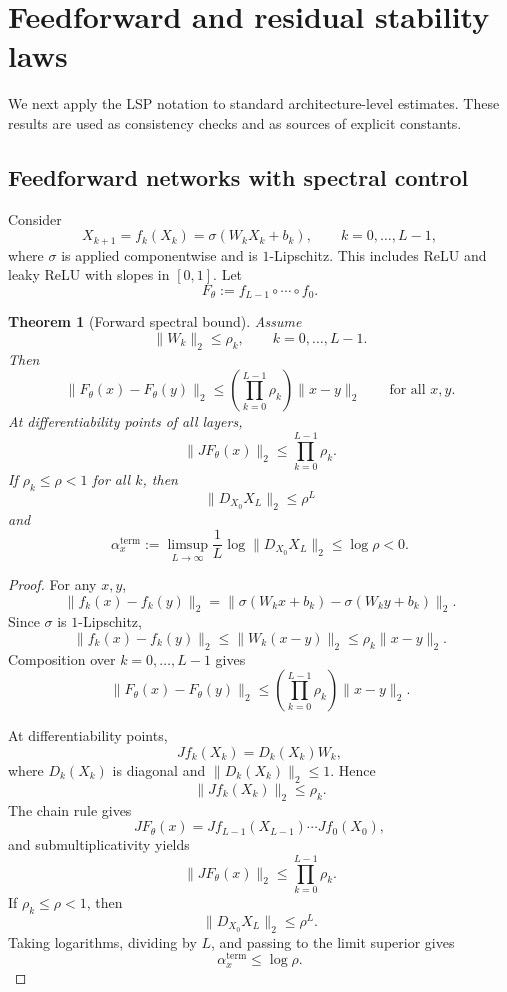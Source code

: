 \documentclass{article}
\newtheorem{theorem}{Theorem}[section]
\numberwithin{equation}{section}
\begin{document}
\section{Feedforward and residual stability laws}
\label{sec:spectral-residual-laws}

We next apply the LSP notation to standard architecture-level estimates. These
results are used as consistency checks and as sources of explicit constants.

\subsection{Feedforward networks with spectral control}
\label{subsec:feedforward-laws}

Consider
\[
X_{k+1}
=
f_k(X_k)
=
\sigma(W_kX_k+b_k),
\qquad
k=0,\ldots,L-1,
\]
where \(\sigma\) is applied componentwise and is \(1\)-Lipschitz. This includes
ReLU and leaky ReLU with slopes in \([0,1]\). Let
\[
F_\theta:=f_{L-1}\circ\cdots\circ f_0 .
\]

\begin{theorem}[Forward spectral bound]
\label{thm:ff-spectral-stability}
Assume
\[
\|W_k\|_2\le \rho_k,
\qquad
k=0,\ldots,L-1 .
\]
Then
\[
\|F_\theta(x)-F_\theta(y)\|_2
\le
\left(\prod_{k=0}^{L-1}\rho_k\right)\|x-y\|_2
\qquad
\text{for all }x,y .
\]
At differentiability points of all layers,
\[
\|JF_\theta(x)\|_2
\le
\prod_{k=0}^{L-1}\rho_k .
\]
If \(\rho_k\le\rho<1\) for all \(k\), then
\[
\|D_{X_0}X_L\|_2\le \rho^L
\]
and
\[
\alpha_x^{\mathrm{term}}
:=
\limsup_{L\to\infty}
\frac1L\log\|D_{X_0}X_L\|_2
\le
\log\rho<0 .
\]
\end{theorem}

\begin{proof}
For any \(x,y\),
\[
\|f_k(x)-f_k(y)\|_2
=
\|\sigma(W_kx+b_k)-\sigma(W_ky+b_k)\|_2 .
\]
Since \(\sigma\) is \(1\)-Lipschitz,
\[
\|f_k(x)-f_k(y)\|_2
\le
\|W_k(x-y)\|_2
\le
\rho_k\|x-y\|_2 .
\]
Composition over \(k=0,\ldots,L-1\) gives
\[
\|F_\theta(x)-F_\theta(y)\|_2
\le
\left(\prod_{k=0}^{L-1}\rho_k\right)\|x-y\|_2 .
\]

At differentiability points,
\[
Jf_k(X_k)=D_k(X_k)W_k,
\]
where \(D_k(X_k)\) is diagonal and \(\|D_k(X_k)\|_2\le1\). Hence
\[
\|Jf_k(X_k)\|_2\le \rho_k .
\]
The chain rule gives
\[
JF_\theta(x)=Jf_{L-1}(X_{L-1})\cdots Jf_0(X_0),
\]
and submultiplicativity yields
\[
\|JF_\theta(x)\|_2
\le
\prod_{k=0}^{L-1}\rho_k .
\]
If \(\rho_k\le\rho<1\), then
\[
\|D_{X_0}X_L\|_2\le\rho^L .
\]
Taking logarithms, dividing by \(L\), and passing to the limit superior gives
\[
\alpha_x^{\mathrm{term}}\le\log\rho .
\]
\end{proof}
\end{document}
